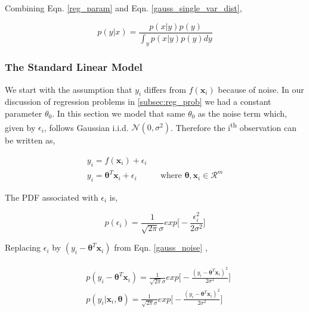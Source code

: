 \documentclass[english]{tktltiki}
\begin{document}
Combining Eqn. \ref{reg_param} and Eqn. \ref{gauss_single_var_dist},

\begin{equation}
p(y|x) = \frac{p(x|y)p(y)}{\int_y{p(x|y)p(y)dy}}
\end{equation}

\subsubsection{The Standard Linear Model}

We start with the assumption that $y_i$ differs from $f(\mathbf{x}_i)$ because of noise. In our discussion of regression problems in \ref{subsec:reg_prob} we had a constant parameter $\theta_0$. In this section we model that same $\theta_0$ as the noise term which, given by $\epsilon_i$, follows Gaussian i.i.d. $\mathcal{N}(0, \sigma ^2)$. Therefore the i\textsuperscript{th} observation can be written as,

\begin{eqnarray}
\label{eqn:standard_linear_model}
y_i = f(\mathbf{x}_i) + \epsilon_i \nonumber \\
y_i = \boldsymbol\theta ^T \mathbf{x}_i + \epsilon_i && \text{where $\boldsymbol\theta, \mathbf{x}_i \in \mathcal{R}^m$}
\label{gauss_noise}
\end{eqnarray}

The PDF associated with $\epsilon_i$ is,

\begin{equation}
p(\epsilon_i) = \frac{1}{\sqrt{2 \pi} \sigma} exp \Big[-\frac{\epsilon_i^2}{2 \sigma^2} \Big]
\end{equation}


Replacing $\epsilon_i$ by $(y_i - \boldsymbol\theta ^T \mathbf{x}_i)$ from Eqn. \ref{gauss_noise} ,

\begin{eqnarray}
\begin{split}
	&p(y_i - \boldsymbol\theta ^T \mathbf{x}_i) = \frac{1}{\sqrt{2 \pi} \sigma} exp \Big[-\frac{(y_i - \boldsymbol\theta ^T \mathbf{x}_i)^2}{2 \sigma^2} \Big] \\
	&p(y_i | \mathbf{x}_i, \boldsymbol\theta) = \frac{1}{\sqrt{2 \pi} \sigma} exp \Big[-\frac{(y_i - \boldsymbol\theta ^T \mathbf{x}_i)^2}{2 \sigma^2} \Big]
\end{split}
\end{eqnarray}
\end{document}
